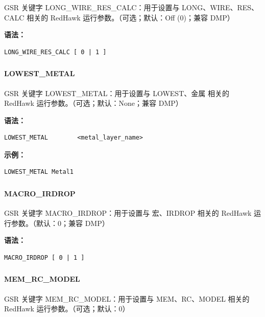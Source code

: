 GSR 关键字 LONG_WIRE_RES_CALC：用于设置与 LONG、WIRE、RES、CALC 相关的 RedHawk 运行参数。（可选；默认：Off (0)；兼容 DMP）

\textbf{语法：}
\begin{lstlisting}
LONG_WIRE_RES_CALC [ 0 | 1 ]
\end{lstlisting}

\subsubsection{}
\paragraph*{LOWEST_METAL}

GSR 关键字 LOWEST_METAL：用于设置与 LOWEST、金属 相关的 RedHawk 运行参数。（可选；默认：None；兼容 DMP）

\textbf{语法：}
\begin{lstlisting}
LOWEST_METAL        <metal_layer_name>
\end{lstlisting}

\textbf{示例：}
\begin{lstlisting}
LOWEST_METAL Metal1
\end{lstlisting}

\subsubsection{}
\paragraph*{MACRO_IRDROP}

GSR 关键字 MACRO_IRDROP：用于设置与 宏、IRDROP 相关的 RedHawk 运行参数。（默认：0；兼容 DMP）

\textbf{语法：}
\begin{lstlisting}
MACRO_IRDROP [ 0 | 1 ]
\end{lstlisting}

\subsubsection{}
\paragraph*{MEM_RC_MODEL}

GSR 关键字 MEM_RC_MODEL：用于设置与 MEM、RC、MODEL 相关的 RedHawk 运行参数。（可选；默认：0）


